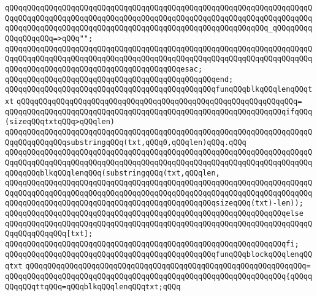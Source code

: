 \verb|qQQqqQQqqQQqqQQqqQQqqQQqqQQqqQQqqQQqqQQqqQQqqQQqqQQqqQQqqQQqqQQqqQQqqQQqqQQqqQQqqQQqqQQqqQQqqQQqqQQqqQQqqQQqqQQqqQQqqQQqqQQqqQQqqQQqqQQqqQQqqQQqqQQqqQQqqQQqqQQqqQQqqQQqqQQqqQQqqQQqqQQqqQQqqQQqqQQqqQQq_qQQqqQQqqQQqqQQqqQQq=>qQQq"";|\newline
\verb|qQQqqQQqqQQqqQQqqQQqqQQqqQQqqQQqqQQqqQQqqQQqqQQqqQQqqQQqqQQqqQQqqQQqqQQqqQQqqQQqqQQqqQQqqQQqqQQqqQQqqQQqqQQqqQQqqQQqqQQqqQQqqQQqqQQqqQQqqQQqqQQqqQQqqQQqqQQqqQQqqQQqqQQqqQQqqQQqqQQqesac;|\newline
\verb|qQQqqQQqqQQqqQQqqQQqqQQqqQQqqQQqqQQqqQQqqQQqqQQqend;|\newline
\newline
\verb|qQQqqQQqqQQqqQQqqQQqqQQqqQQqqQQqqQQqqQQqqQQqqQQqfunqQQqblkqQQqlenqQQqtxt|\newline
\verb|qQQqqQQqqQQqqQQqqQQqqQQqqQQqqQQqqQQqqQQqqQQqqQQqqQQqqQQqqQQqqQQq=|\newline
\verb|qQQqqQQqqQQqqQQqqQQqqQQqqQQqqQQqqQQqqQQqqQQqqQQqqQQqqQQqqQQqqQQqifqQQq(sizeqQQqtxtqQQq>qQQqlen)|\newline
\newline
\verb|qQQqqQQqqQQqqQQqqQQqqQQqqQQqqQQqqQQqqQQqqQQqqQQqqQQqqQQqqQQqqQQqqQQqqQQqqQQqqQQqqQQqsubstringqQQq(txt,qQQq0,qQQqlen)qQQq.qQQq|\newline
\verb|qQQqqQQqqQQqqQQqqQQqqQQqqQQqqQQqqQQqqQQqqQQqqQQqqQQqqQQqqQQqqQQqqQQqqQQqqQQqqQQqqQQqqQQqqQQqqQQqqQQqqQQqqQQqqQQqqQQqqQQqqQQqqQQqqQQqqQQqqQQqqQQqqQQqblkqQQqlenqQQq(substringqQQq(txt,qQQqlen,|\newline
\verb|qQQqqQQqqQQqqQQqqQQqqQQqqQQqqQQqqQQqqQQqqQQqqQQqqQQqqQQqqQQqqQQqqQQqqQQqqQQqqQQqqQQqqQQqqQQqqQQqqQQqqQQqqQQqqQQqqQQqqQQqqQQqqQQqqQQqqQQqqQQqqQQqqQQqqQQqqQQqqQQqqQQqqQQqqQQqqQQqqQQqqQQqqQQqsizeqQQq(txt)-len));|\newline
\verb|qQQqqQQqqQQqqQQqqQQqqQQqqQQqqQQqqQQqqQQqqQQqqQQqqQQqqQQqqQQqqQQqelse|\newline
\verb|qQQqqQQqqQQqqQQqqQQqqQQqqQQqqQQqqQQqqQQqqQQqqQQqqQQqqQQqqQQqqQQqqQQqqQQqqQQqqQQqqQQq[txt];|\newline
\verb|qQQqqQQqqQQqqQQqqQQqqQQqqQQqqQQqqQQqqQQqqQQqqQQqqQQqqQQqqQQqqQQqfi;|\newline
\newline
\verb|qQQqqQQqqQQqqQQqqQQqqQQqqQQqqQQqqQQqqQQqqQQqqQQqfunqQQqblockqQQqlenqQQqtxt|\newline
\verb|qQQqqQQqqQQqqQQqqQQqqQQqqQQqqQQqqQQqqQQqqQQqqQQqqQQqqQQqqQQqqQQq=|\newline
\verb|qQQqqQQqqQQqqQQqqQQqqQQqqQQqqQQqqQQqqQQqqQQqqQQqqQQqqQQqqQQqqQQq{qQQqqQQqqQQqttqQQq=qQQqblkqQQqlenqQQqtxt;qQQq|\newline
